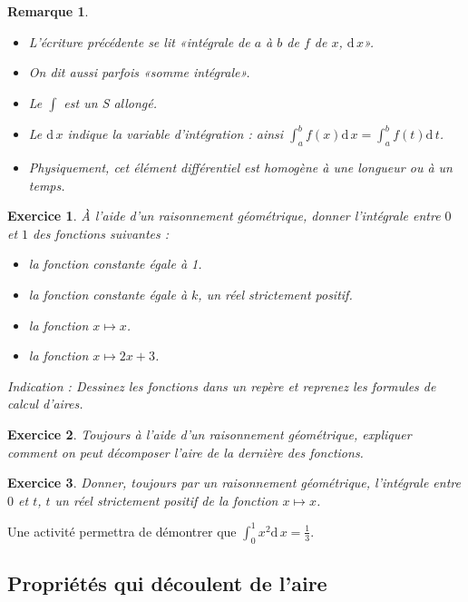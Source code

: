 \documentclass[11pt,a4paper,french]{article}
\newcommand{\diff}[1]{\mathrm{d}\,#1}
\theoremstyle{break}
\theoremstyle{plain}
\newtheorem{exerciceT}{Exercice}
\theoremstyle{nonumberplain}
\newtheorem{remarque}{Remarque}
\theoremstyle{nonumberbreak}
\newenvironment{exercice}{\begin{framed}\begin{exerciceT}}{\end{exerciceT}\end{framed}}
\begin{document}
\begin{remarque}
  \begin{itemize}
    \item L'écriture précédente se lit «intégrale de $a$ à $b$ de $f$ de
      $x$, $\diff{x}$».
    \item On dit aussi parfois «somme intégrale».
    \item Le $\int$ est un \textsl{S} allongé.
    \item Le $\diff{x}$ indique la variable d'intégration : ainsi
      $\int_a^bf(x)\diff{x} = \int_a^bf(t)\diff{t}$.
    \item Physiquement, cet élément différentiel est homogène à une
      longueur ou à un temps.
  \end{itemize}
\end{remarque}

\begin{exercice}
  À l'aide d'un raisonnement géométrique, donner l'intégrale entre $0$
  et $1$ des fonctions suivantes :
  \begin{itemize}
    \item la fonction constante égale à 1.
    \item la fonction constante égale à $k$, un réel strictement
      positif.
    \item la fonction $x\mapsto x$.
    \item la fonction $x\mapsto 2x+3$.
  \end{itemize}
  \emph{Indication :} Dessinez les fonctions dans un repère et reprenez
  les formules de calcul d'aires.
\end{exercice}

\begin{exercice}
  Toujours à l'aide d'un raisonnement géométrique, expliquer comment on
  peut décomposer l'aire de la dernière des fonctions.
\end{exercice}

\begin{exercice}
  Donner, toujours par un raisonnement géométrique, l'intégrale entre
  $0$ et $t$, $t$ un réel strictement positif de la fonction $x\mapsto
  x$.
\end{exercice}

Une activité permettra de démontrer que $\int_0^1x^2\diff{x} = \frac13$.

\subsection{Propriétés qui découlent de l'aire}
\end{document}
